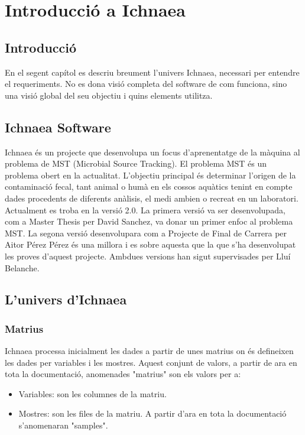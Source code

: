\chapter{Introducci\'{o} a Ichnaea}
\label{cha:background}

\section*{Introducci\'{o}}
En el segent cap\'{i}tol es descriu breument l'univers Ichnaea, necessari per entendre el requeriments. No es dona visi\'{o} completa del software de com funciona, sino una visi\'{o} global del seu objectiu i quins elements utilitza.

\section{Ichnaea Software}
Ichnaea \'{e}s un projecte que desenvolupa un focus d'aprenentatge de la m\`{a}quina al problema de MST (Microbial Source Tracking). El problema MST \'{e}s un problema obert en la actualitat. L'objectiu principal \'{e}s determinar l'origen de la contaminaci\'{o} fecal, tant animal o hum\`{a} en els cossos aqu\`{a}tics tenint en compte dades procedents de diferents an\`{a}lisis, el medi ambien o recreat en un laboratori. \\

Actualment es troba en la versi\'{o} 2.0. La primera versi\'{o} va ser desenvolupada, com a Master Thesis per David Sanchez, va donar un primer enfoc al problema MST. La segona versi\'{o} desenvolupara com a Projecte de Final de Carrera per Aitor P\'{e}rez P\'{e}rez \'{e}s una millora i es sobre aquesta que la que s'ha desenvolupat les proves d'aquest projecte. Ambdues versions han sigut supervisades per Llu\'{i} Belanche.\\

\section{L'univers d'Ichnaea}

\subsection{Matrius}
Ichnaea processa inicialment les dades a partir de unes matrius on \'e{s} defineixen les dades per variables i les mostres. Aquest conjunt de valors, a partir de ara en tota la documentaci\'{o}, anomenades "matrius" son els valors per a:
\begin{itemize}
\item Variables: son les columnes de la matriu. 
\item Mostres: son les files de la matriu. A partir d'ara en tota la documentaci\'{o} s'anomenaran "samples".
\end{itemize}

